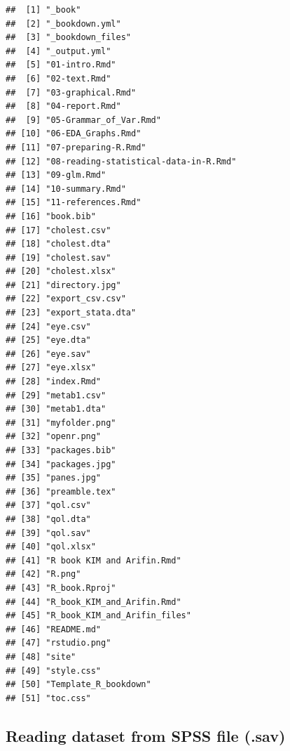 \documentclass[]{book}
\theoremstyle{definition}
\theoremstyle{definition}
\theoremstyle{remark}
\begin{document}
\begin{verbatim}
##  [1] "_book"                               
##  [2] "_bookdown.yml"                       
##  [3] "_bookdown_files"                     
##  [4] "_output.yml"                         
##  [5] "01-intro.Rmd"                        
##  [6] "02-text.Rmd"                         
##  [7] "03-graphical.Rmd"                    
##  [8] "04-report.Rmd"                       
##  [9] "05-Grammar_of_Var.Rmd"               
## [10] "06-EDA_Graphs.Rmd"                   
## [11] "07-preparing-R.Rmd"                  
## [12] "08-reading-statistical-data-in-R.Rmd"
## [13] "09-glm.Rmd"                          
## [14] "10-summary.Rmd"                      
## [15] "11-references.Rmd"                   
## [16] "book.bib"                            
## [17] "cholest.csv"                         
## [18] "cholest.dta"                         
## [19] "cholest.sav"                         
## [20] "cholest.xlsx"                        
## [21] "directory.jpg"                       
## [22] "export_csv.csv"                      
## [23] "export_stata.dta"                    
## [24] "eye.csv"                             
## [25] "eye.dta"                             
## [26] "eye.sav"                             
## [27] "eye.xlsx"                            
## [28] "index.Rmd"                           
## [29] "metab1.csv"                          
## [30] "metab1.dta"                          
## [31] "myfolder.png"                        
## [32] "openr.png"                           
## [33] "packages.bib"                        
## [34] "packages.jpg"                        
## [35] "panes.jpg"                           
## [36] "preamble.tex"                        
## [37] "qol.csv"                             
## [38] "qol.dta"                             
## [39] "qol.sav"                             
## [40] "qol.xlsx"                            
## [41] "R book KIM and Arifin.Rmd"           
## [42] "R.png"                               
## [43] "R_book.Rproj"                        
## [44] "R_book_KIM_and_Arifin.Rmd"           
## [45] "R_book_KIM_and_Arifin_files"         
## [46] "README.md"                           
## [47] "rstudio.png"                         
## [48] "site"                                
## [49] "style.css"                           
## [50] "Template_R_bookdown"                 
## [51] "toc.css"
\end{verbatim}

\subsection{Reading dataset from SPSS file
(.sav)}\label{reading-dataset-from-spss-file-.sav}
\end{document}

